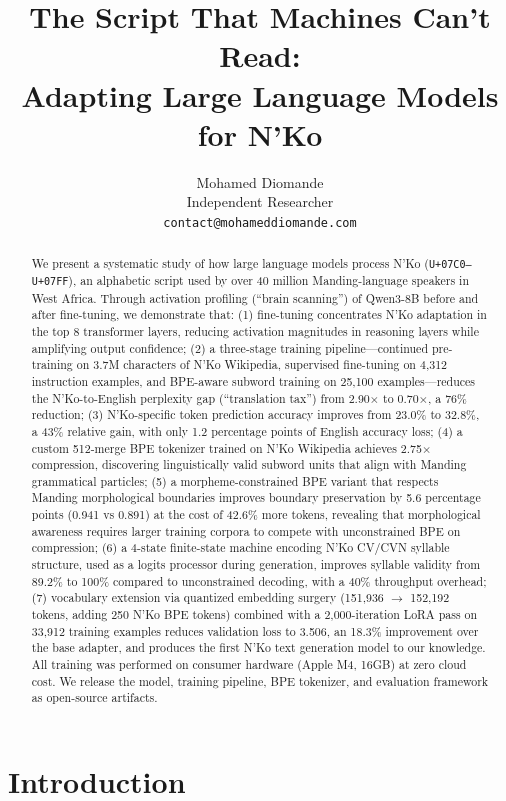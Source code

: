 \documentclass[11pt]{article}
\title{The Script That Machines Can't Read:\\Adapting Large Language Models for N'Ko}
\author{
  Mohamed Diomande \\
  Independent Researcher \\
  \texttt{contact@mohameddiomande.com}
}
\begin{document}
\maketitle

\begin{abstract}
We present a systematic study of how large language models process N'Ko (\texttt{U+07C0--U+07FF}), an alphabetic script used by over 40 million Manding-language speakers in West Africa.
Through activation profiling (``brain scanning'') of Qwen3-8B before and after fine-tuning, we demonstrate that:
(1) fine-tuning concentrates N'Ko adaptation in the top 8 transformer layers, reducing activation magnitudes in reasoning layers while amplifying output confidence;
(2) a three-stage training pipeline---continued pre-training on 3.7M characters of N'Ko Wikipedia, supervised fine-tuning on 4,312 instruction examples, and BPE-aware subword training on 25,100 examples---reduces the N'Ko-to-English perplexity gap (``translation tax'') from 2.90$\times$ to 0.70$\times$, a 76\% reduction;
(3) N'Ko-specific token prediction accuracy improves from 23.0\% to 32.8\%, a 43\% relative gain, with only 1.2 percentage points of English accuracy loss;
(4) a custom 512-merge BPE tokenizer trained on N'Ko Wikipedia achieves 2.75$\times$ compression, discovering linguistically valid subword units that align with Manding grammatical particles;
(5) a morpheme-constrained BPE variant that respects Manding morphological boundaries improves boundary preservation by 5.6 percentage points (0.941 vs 0.891) at the cost of 42.6\% more tokens, revealing that morphological awareness requires larger training corpora to compete with unconstrained BPE on compression;
(6) a 4-state finite-state machine encoding N'Ko CV/CVN syllable structure, used as a logits processor during generation, improves syllable validity from 89.2\% to 100\% compared to unconstrained decoding, with a 40\% throughput overhead;
(7) vocabulary extension via quantized embedding surgery (151,936 $\to$ 152,192 tokens, adding 250 N'Ko BPE tokens) combined with a 2,000-iteration LoRA pass on 33,912 training examples reduces validation loss to 3.506, an 18.3\% improvement over the base adapter, and produces the first N'Ko text generation model to our knowledge.
All training was performed on consumer hardware (Apple M4, 16GB) at zero cloud cost.
We release the model, training pipeline, BPE tokenizer, and evaluation framework as open-source artifacts.
\end{abstract}

\section{Introduction}
\end{document}

